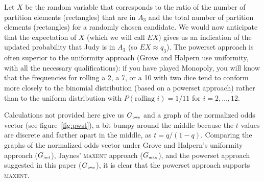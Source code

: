 \documentclass[smallextended]{svjour3}       %
\begin{document}
Let $X$ be the random variable that corresponds to the ratio of the
number of partition elements (rectangles) that are in $A_{3}$ and the
total number of partition elements (rectangles) for a randomly chosen
candidate. We would now anticipate that the expectation of $X$ (which
we will call $EX$) gives us an indication of the updated probability
that Judy is in $A_{3}$ (so $EX\approx{}q_{3}$). The powerset approach
is often superior to the uniformity approach (Grove and Halpern use
uniformity, with all the necessary qualifications): if you have played
Monopoly, you will know that the frequencies for rolling a 2, a 7, or
a 10 with two dice tend to conform more closely to the binomial
distribution (based on a powerset approach) rather than to the uniform
distribution with $P(\mbox{rolling }i)=1/11$ for $i=2,{\ldots},12$.


Calculations not provided here give us $G_{\mbox{\tiny pws}}$ and a
graph of the normalized odds vector (see figure~\ref{fig:pwst}), a bit
bumpy around the middle because the $t$-values are discrete and
farther apart in the middle, as $t=q/(1-q)$. Comparing the graphs of
the normalized odds vector under Grove and Halpern's uniformity
approach ($G_{\mbox{\tiny ind}}$), Jaynes' \textsc{maxent} approach
($G_{\mbox{\tiny max}}$), and the powerset approach suggested in this
paper ($G_{\mbox{\tiny pws}}$), it is clear that the powerset approach
supports \textsc{maxent}.
\end{document}

